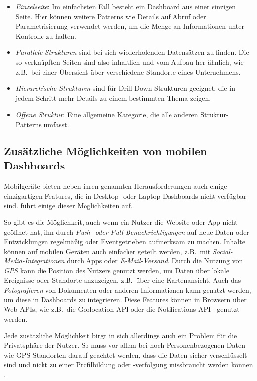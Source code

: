 \begin{itemize}
    \item \emph{Einzelseite}: Im einfachsten Fall besteht ein Dashboard aus einer einzigen Seite.
    Hier können weitere Patterns wie Details auf Abruf oder Parametrisierung verwendet werden, um die Menge an Informationen unter Kontrolle zu halten.
    \item \emph{Parallele Strukturen} sind bei sich wiederholenden Datensätzen zu finden.
    Die so verknüpften Seiten sind also inhaltlich und vom Aufbau her ähnlich, wie z.B.\ bei einer Übersicht über verschiedene Standorte eines Unternehmens.
    \item \emph{Hierarchische Strukturen} sind für Drill-Down-Strukturen geeignet, die in jedem Schritt mehr Details zu einem bestimmten Thema zeigen.
    \item \emph{Offene Struktur}: Eine allgemeine Kategorie, die alle anderen Struktur-Patterns umfasst.
\end{itemize}

\subsection{Zusätzliche Möglichkeiten von mobilen Dashboards}\label{subsec:additional-capabilities-of-mobile-dashboards}


Mobilgeräte bieten neben ihren genannten Herausforderungen auch einige einzigartigen Features, die in Desktop- oder Laptop-Dashboards nicht verfügbar sind.
\autocite[S. 609]{Watson.MobileBi.2015} führt einige dieser Möglichkeiten auf.

So gibt es die Möglichkeit, auch wenn ein Nutzer die Website oder App nicht geöffnet hat, ihn durch \emph{Push- oder Pull-Benachrichtigungen} auf neue Daten oder Entwicklungen regelmäßig oder Eventgetrieben aufmerksam zu machen.
Inhalte können auf mobilen Geräten auch einfacher geteilt werden, z.B.\ mit \emph{Social-Media-Integrationen} durch Apps oder \emph{E-Mail-Versand}.
Durch die Nutzung von \emph{GPS} \autocite{Steiner.GeolocationInTheBrowser.2019} kann die Position des Nutzers genutzt werden, um Daten über lokale Ereignisse oder Standorte anzuzeigen, z.B.\ über eine Kartenansicht.
Auch das \emph{Fotografieren} von Dokumenten oder anderen Informationen kann genutzt werden, um diese in Dashboards zu integrieren.
Diese Features können in Browsern über Web-\ac{API}s, wie z.B.\ die Geolocation-\ac{API} \autocite{Steiner.GeolocationInTheBrowser.2019} oder die Notifications-\ac{API} \autocite{MDN.UsingNotificationsAPI.2024}, genutzt werden.

Jede zusätzliche Möglichkeit birgt in sich allerdings auch ein Problem für die Privatsphäre der Nutzer.
So muss vor allem bei hoch-Personenbezogenen Daten wie GPS-Standorten darauf geachtet werden, dass die Daten sicher verschlüsselt sind und nicht zu einer Profilbildung oder -verfolgung missbraucht werden können \autocite[S. 4--7]{Wang.PreservingPrivacyForLocationBased.2010}.


